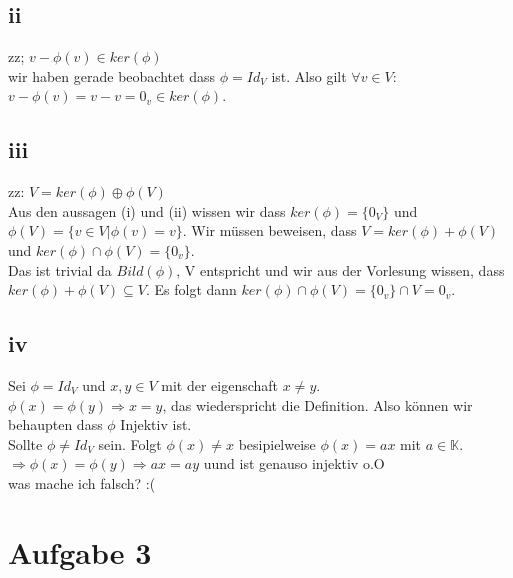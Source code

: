 \documentclass[10pt,a4paper]{article}
\begin{document}
\subsection{ii}
zz; $v-\phi(v) \in ker(\phi)$\\
wir haben gerade beobachtet dass $\phi = Id_V$ ist. Also gilt $\forall v \in V :$\\
$v -\phi(v) = v -v = 0_v \in ker(\phi)$. 
\subsection{iii}
zz: $V = ker(\phi) \oplus \phi(V)$\\
Aus den aussagen (i) und (ii) wissen wir dass $ker(\phi) = \{0_V\}$ und\\ $\phi(V) = \{ v \in V | \phi(v) = v \}$. Wir müssen beweisen, dass $V = ker(\phi) + \phi(V)$ und $ker(\phi) \cap \phi(V) = \{0_v\}$.\\
Das ist trivial da $Bild(\phi)$, V entspricht und wir aus der Vorlesung wissen, dass $ker(\phi) + \phi(V) \subseteq V$. Es folgt dann $ker(\phi) \cap \phi(V) = \{0_v\} \cap V = {0_v}$. 
\subsection{iv}
Sei $\phi = Id_V$ und $x,y \in V$ mit der eigenschaft $x \neq y$.\\
$ \phi(x) = \phi(y) \Rightarrow x = y$, das wiederspricht die Definition. Also können wir behaupten dass $\phi$ Injektiv ist.\\
Sollte $\phi \neq Id_V$ sein. Folgt $\phi(x) \neq x$ besipielweise $\phi(x) = ax$ mit $a \in \mathbb{K}$.\\
$\Rightarrow \phi(x) = \phi(y) \Rightarrow ax = ay$ uund ist genauso injektiv o.O \\
was mache ich falsch? :(
\section{Aufgabe 3}
\end{document}
